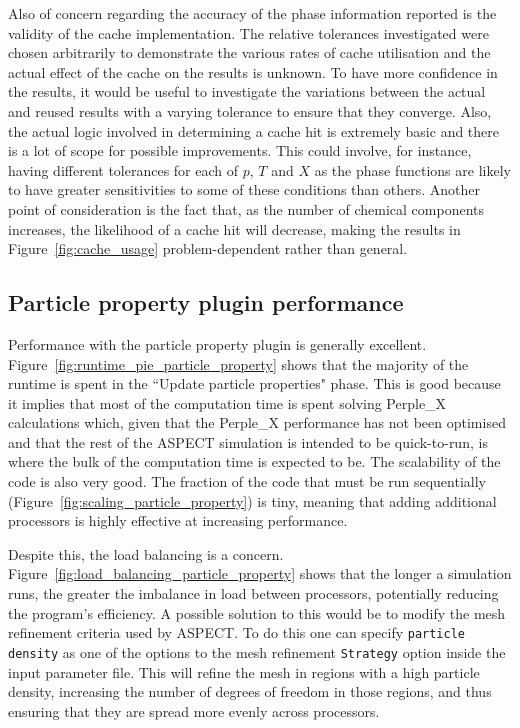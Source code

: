 Also of concern regarding the accuracy of the phase information reported is the validity of the cache implementation.
The relative tolerances investigated were chosen arbitrarily to demonstrate the various rates of cache utilisation and the actual effect of the cache on the results is unknown.
To have more confidence in the results, it would be useful to investigate the variations between the actual and reused results with a varying tolerance to ensure that they converge.
Also, the actual logic involved in determining a cache hit is extremely basic and there is a lot of scope for possible improvements.
This could involve, for instance, having different tolerances for each of $p$, $T$ and $X$ as the phase functions are likely to have greater sensitivities to some of these conditions than others.
Another point of consideration is the fact that, as the number of chemical components increases, the likelihood of a cache hit will decrease, making the results in Figure~\ref{fig:cache_usage} problem-dependent rather than general.
 
\subsection{Particle property plugin performance}

Performance with the particle property plugin is generally excellent.
Figure~\ref{fig:runtime_pie_particle_property} shows that the majority of the runtime is spent in the ``Update particle properties" phase.
This is good because it implies that most of the computation time is spent solving Perple\_X calculations which, given that the Perple\_X performance has not been optimised and that the rest of the ASPECT simulation is intended to be quick-to-run, is where the bulk of the computation time is expected to be.
The scalability of the code is also very good.
The fraction of the code that must be run sequentially (Figure~\ref{fig:scaling_particle_property}) is tiny, meaning that adding additional processors is highly effective at increasing performance.

Despite this, the load balancing is a concern.
Figure~\ref{fig:load_balancing_particle_property} shows that the longer a simulation runs, the greater the imbalance in load between processors, potentially reducing the program's efficiency.
A possible solution to this would be to modify the mesh refinement criteria used by ASPECT.
To do this one can specify \texttt{particle density} as one of the options to the mesh refinement \texttt{Strategy} option inside the input parameter file.
This will refine the mesh in regions with a high particle density, increasing the number of degrees of freedom in those regions, and thus ensuring that they are spread more evenly across processors.

